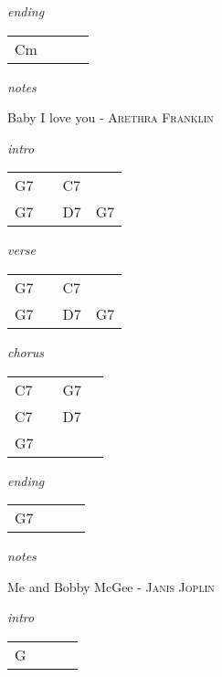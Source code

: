\documentclass[12pt]{article}
\begin{document}
\textit{ending}

\begin{tabular}{|P{1.25in}|P{1.25in}|P{1.25in}|P{1.25in}|}
  Cm &   &   &   \\
\end{tabular}

\textit{notes}

\newpage

{\Huge Baby I love you} {\huge - \textsc{Arethra Franklin}}

\huge
\textit{intro}

\begin{tabular}{|P{1.25in}|P{1.25in}|P{1.25in}|P{1.25in}|}
  G7 &   & C7  &   \\
  G7 &   & D7  & G7 \\
\end{tabular}

\textit{verse}

\begin{tabular}{|P{1.25in}|P{1.25in}|P{1.25in}|P{1.25in}|}
  G7 &   & C7  &   \\
  G7 &   & D7  & G7 \\
\end{tabular}

\textit{chorus}

\begin{tabular}{|P{1.25in}|P{1.25in}|P{1.25in}|P{1.25in}|}
  C7 &   &  G7 &   \\
  C7 &   &  D7 &   \\
  G7 &   &     &   \\
\end{tabular}

\textit{ending}

\begin{tabular}{|P{1.25in}|P{1.25in}|P{1.25in}|P{1.25in}|}
  G7 &   &   &   \\
\end{tabular}

\textit{notes}

\newpage

{\Huge Me and Bobby McGee} {\huge - \textsc{Janis Joplin}}

\huge
\textit{intro}

\begin{tabular}{|P{1.25in}|P{1.25in}|P{1.25in}|P{1.25in}|}
  G &   &   &   \\
\end{tabular}
\end{document}
